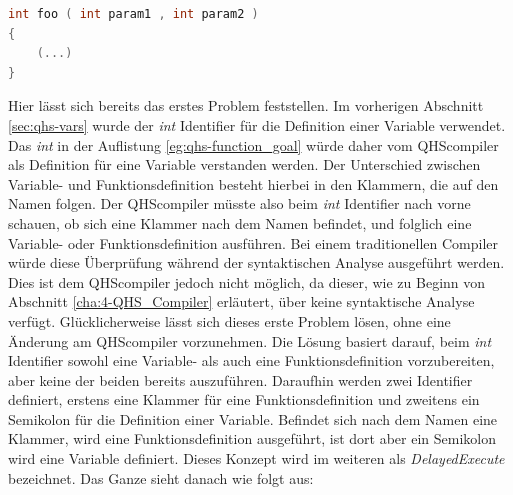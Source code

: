 \begin{lstlisting}[language=C, label=eg:qhs-function_goal, caption=Ziel für die Definition einer Funktion in QHS]
int foo ( int param1 , int param2 )
{
    (...)
}
\end{lstlisting}

Hier lässt sich bereits das erstes Problem feststellen. Im vorherigen Abschnitt \ref{sec:qhs-vars} wurde der \textit{int} Identifier für die Definition einer Variable verwendet. 
Das \textit{int} in der Auflistung \ref{eg:qhs-function_goal} würde daher vom QHScompiler als Definition für eine Variable verstanden werden. Der Unterschied zwischen Variable- und Funktionsdefinition besteht hierbei in den Klammern,
die auf den Namen folgen. Der QHScompiler müsste also beim \textit{int} Identifier nach vorne schauen, ob sich eine Klammer nach dem Namen befindet, und folglich eine Variable- oder Funktionsdefinition ausführen.
Bei einem traditionellen Compiler würde diese Überprüfung während der syntaktischen Analyse ausgeführt werden.
Dies ist dem QHScompiler jedoch nicht möglich, da dieser, wie zu Beginn von Abschnitt \ref{cha:4-QHS_Compiler} erläutert, über keine syntaktische Analyse verfügt.
Glücklicherweise lässt sich dieses erste Problem lösen, ohne eine Änderung am QHScompiler vorzunehmen.
Die Lösung basiert darauf, beim \textit{int} Identifier sowohl eine Variable- als auch eine Funktionsdefinition vorzubereiten, aber keine der beiden bereits auszuführen.
Daraufhin werden zwei Identifier definiert, erstens eine Klammer für eine Funktionsdefinition und zweitens ein Semikolon für die Definition einer Variable.
Befindet sich nach dem Namen eine Klammer, wird eine Funktionsdefinition ausgeführt, ist dort aber ein Semikolon wird eine Variable definiert.
Dieses Konzept wird im weiteren als \textit{DelayedExecute} bezeichnet. Das Ganze sieht danach wie folgt aus:

